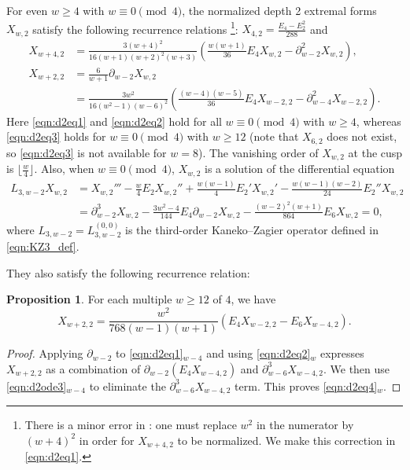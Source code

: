 \documentclass[10pt,reqno]{amsproc}
\newcommand{\1}{\mathds{1}}	%
\theoremstyle{definition}
\newtheorem{proposition}[theorem]{Proposition}
\theoremstyle{remark}
\begin{document}
For even $w \geq 4$ with $w \equiv 0 \pmod{4}$, the normalized depth 2 extremal forms $X_{w, 2}$ satisfy the following recurrence relations \cite{grabner2020quasimodular}\footnote{There is a minor error in \cite{grabner2020quasimodular}: one must replace $w^2$ in the numerator by $(w+4)^2$ in order for $X_{w+4,2}$ to be normalized. We make this correction in \eqref{eqn:d2eq1}.}: $X_{4, 2} = \frac{E_4 - E_2^2}{288}$ and
\begin{align}
    X_{w+4, 2} &= \frac{3(w+4)^2}{16(w+1)(w+2)^{2}(w+3)} \left(\frac{w(w+1)}{36} E_4 X_{w, 2} - \partial_{w-2}^{2}X_{w, 2}\right), \label{eqn:d2eq1} \\
    X_{w+2, 2} &= \frac{6}{w + 1} \partial_{w-2}X_{w, 2} \label{eqn:d2eq2} \\
    &= \frac{3w^2}{16(w^2 - 1)(w-6)^2} \left(\frac{(w-4)(w-5)}{36} E_4 X_{w-2,2} - \partial_{w-4}^{2}X_{w-2, 2}\right). \label{eqn:d2eq3}
\end{align}
Here \eqref{eqn:d2eq1} and \eqref{eqn:d2eq2} hold for all $w \equiv 0 \pmod{4}$ with $w \geq 4$, whereas \eqref{eqn:d2eq3} holds for $w \equiv 0 \pmod{4}$ with $w \geq 12$ (note that $X_{6,2}$ does not exist, so \eqref{eqn:d2eq3} is not available for $w = 8$).
The vanishing order of $X_{w, 2}$ at the cusp is $\lfloor \frac{w}{4} \rfloor$.
Also, when $w \equiv 0 \pmod{4}$, $X_{w,2}$ is a solution of the differential equation
\begin{align}
L_{3,w-2} X_{w, 2} &=  X_{w, 2}''' - \frac{w}{4} E_2 X_{w, 2}'' + \frac{w(w-1)}{4} E_{2}'X_{w, 2}' - \frac{w(w-1)(w-2)}{24} E_2'' X_{w, 2} \label{eqn:d2ode2} \\
&= \partial_{w-2}^{3}X_{w, 2} - \frac{3w^2 - 4}{144} E_4 \partial_{w-2}X_{w, 2} - \frac{(w-2)^{2}(w+1)}{864} E_6 X_{w, 2} = 0, \label{eqn:d2ode3}
\end{align}
where $L_{3,w-2} = L_{3,w-2}^{(0,0)}$ is the third-order Kaneko--Zagier operator defined in \eqref{eqn:KZ3_def}.

They also satisfy the following recurrence relation:
\begin{proposition}
\label{prop:d2eq}
For each multiple $w \geq 12$ of $4$, we have
\begin{equation}
\label{eqn:d2eq4}
    X_{w+2, 2} = \frac{w^{2}}{768(w - 1)(w+1)}(E_4 X_{w-2, 2}  - E_6 X_{w-4, 2}).
\end{equation}
\end{proposition}
\begin{proof}
Applying $\partial_{w-2}$ to \eqref{eqn:d2eq1}$_{w-4}$ and using \eqref{eqn:d2eq2}${}_{w}$ expresses $X_{w+2, 2}$ as a combination of $\partial_{w-2}(E_4 X_{w-4, 2})$ and $\partial_{w-6}^{3}X_{w-4, 2}$.
We then use \eqref{eqn:d2ode3}${}_{w-4}$ to eliminate the $\partial_{w-6}^{3}X_{w-4, 2}$ term.
This proves \eqref{eqn:d2eq4}${}_{w}$.
\end{proof}
\end{document}
